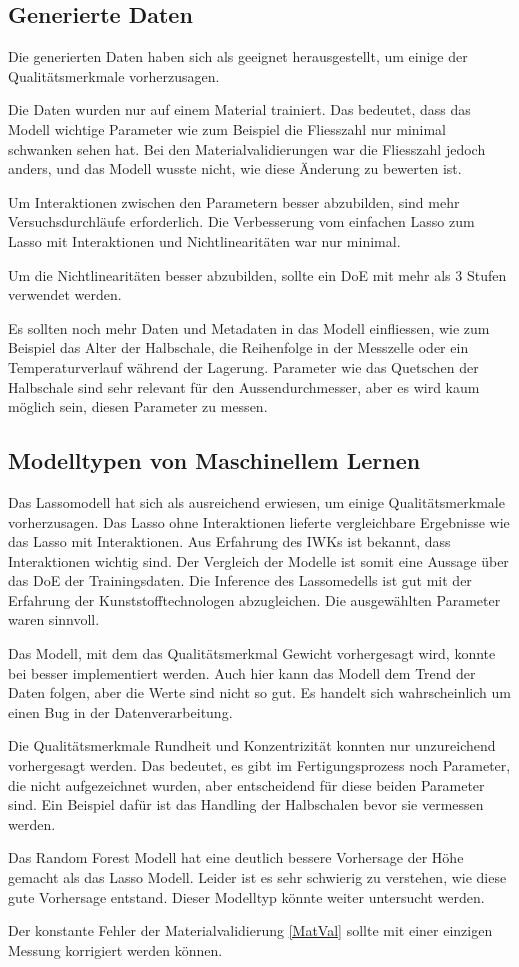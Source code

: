 \subsection{Generierte Daten}
Die generierten Daten haben sich als geeignet herausgestellt, um einige der Qualitätsmerkmale vorherzusagen.

Die Daten wurden nur auf einem Material trainiert. Das bedeutet, dass das Modell wichtige Parameter wie zum Beispiel die Fliesszahl nur minimal schwanken sehen hat. Bei den Materialvalidierungen war die Fliesszahl jedoch anders, und das Modell wusste nicht, wie diese Änderung zu bewerten ist.

Um Interaktionen zwischen den Parametern besser abzubilden, sind mehr Versuchsdurchläufe erforderlich. Die Verbesserung vom einfachen Lasso zum Lasso mit Interaktionen und Nichtlinearitäten war nur minimal.

Um die Nichtlinearitäten besser abzubilden, sollte ein DoE mit mehr als 3 Stufen verwendet werden.

Es sollten noch mehr Daten und Metadaten in das Modell einfliessen, wie zum Beispiel das Alter der Halbschale, die Reihenfolge in der Messzelle oder ein Temperaturverlauf während der Lagerung. Parameter wie das Quetschen der Halbschale sind sehr relevant für den Aussendurchmesser, aber es wird kaum möglich sein, diesen Parameter zu messen.

\subsection{Modelltypen von Maschinellem Lernen}
Das Lassomodell hat sich als ausreichend erwiesen, um einige Qualitätsmerkmale vorherzusagen. Das Lasso ohne Interaktionen lieferte vergleichbare Ergebnisse wie das Lasso mit Interaktionen. Aus Erfahrung des IWKs ist bekannt, dass Interaktionen wichtig sind. Der Vergleich der Modelle ist somit eine Aussage über das DoE der Trainingsdaten. Die Inference des Lassomedells ist gut mit der Erfahrung der Kunststofftechnologen abzugleichen. Die ausgewählten Parameter waren sinnvoll.

Das Modell, mit dem das Qualitätsmerkmal Gewicht vorhergesagt wird, konnte bei \cite{MAGew} besser implementiert werden. Auch hier kann das Modell dem Trend der Daten folgen, aber die Werte sind nicht so gut. Es handelt sich wahrscheinlich um einen Bug in der Datenverarbeitung.

Die Qualitätsmerkmale Rundheit und Konzentrizität konnten nur unzureichend vorhergesagt werden. Das bedeutet, es gibt im Fertigungsprozess noch Parameter, die nicht aufgezeichnet wurden, aber entscheidend für diese beiden Parameter sind. Ein Beispiel dafür ist das Handling der Halbschalen bevor sie vermessen werden.

Das Random Forest Modell hat eine deutlich bessere Vorhersage der Höhe gemacht als das Lasso Modell. Leider ist es sehr schwierig zu verstehen, wie diese gute Vorhersage entstand. Dieser Modelltyp könnte weiter untersucht werden.

Der konstante Fehler der Materialvalidierung \ref{MatVal} sollte mit einer einzigen Messung korrigiert werden können.
